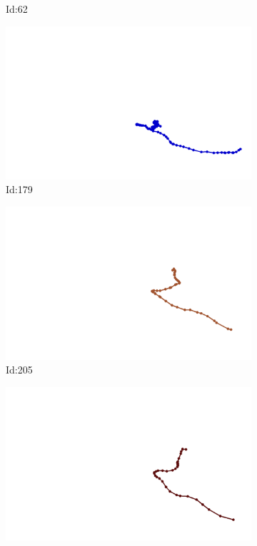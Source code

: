 \documentclass[12pt,twoside]{report}
\begin{document}
\begin{figure}
\begin{subfigure}[b]{0.20\textwidth}
\caption{Id:62}
\end{subfigure}
\begin{subfigure}[b]{0.20\textwidth}
\centering
\includegraphics[width=\textwidth]{../trajectories/179.png}
\caption{Id:179}
\end{subfigure}
\begin{subfigure}[b]{0.20\textwidth}
\centering
\includegraphics[width=\textwidth]{../trajectories/205.png}
\caption{Id:205}
\end{subfigure}
\begin{subfigure}[b]{0.20\textwidth}
\centering
\includegraphics[width=\textwidth]{../trajectories/243.png}

\end{subfigure}
\end{figure}
\end{document}
